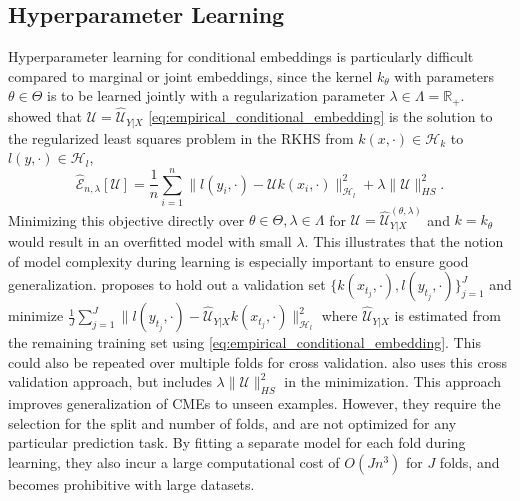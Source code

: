 \documentclass[twoside]{article}
\begin{document}
		\subsection{Hyperparameter Learning}
		
			Hyperparameter learning for conditional embeddings is particularly difficult compared to marginal or joint embeddings, since the kernel $k_{\theta}$ with parameters $\theta \in \Theta$ is to be learned jointly with a regularization parameter $\lambda \in \Lambda = \mathbb{R}_{+}$. \cite{lever2012conditional} showed that $\mathcal{U} = \hat{\mathcal{U}}_{Y | X}$ \eqref{eq:empirical_conditional_embedding} is the solution to the regularized least squares problem in the RKHS from $k(x, \cdot) \in \mathcal{H}_{k}$ to $l(y, \cdot) \in \mathcal{H}_{l}$, 
			\begin{equation}
				\hat{\mathcal{E}}_{n, \lambda}[\mathcal{U}] = \frac{1}{n} \sum_{i = 1}^{n} \big\| l(y_{i}, \cdot) - \mathcal{U} k(x_{i}, \cdot) \big\|_{\mathcal{H}_{l}}^{2} + \lambda \| \mathcal{U} \|^{2}_{HS}.
			\label{eq:lever_objective}
			\end{equation}
			Minimizing this objective directly over $\theta \in \Theta, \lambda \in \Lambda$ for $\mathcal{U} = \hat{\mathcal{U}}^{(\theta, \lambda)}_{Y | X}$ and $k = k_{\theta}$ would result in an overfitted model with small $\lambda$. This illustrates that the notion of model complexity during learning is especially important to ensure good generalization. \cite{lever2012conditional} proposes to hold out a validation set $\{k(x_{t_{j}}, \cdot), l(y_{t_{j}}, \cdot)\}_{j = 1}^{J}$ and minimize $\frac{1}{J} \sum_{j = 1}^{J} \big\| l(y_{t_{j}}, \cdot) - \hat{\mathcal{U}}_{Y | X} k(x_{t_{j}}, \cdot) \big\|_{\mathcal{H}_{l}}^{2}$ where $\hat{\mathcal{U}}_{Y | X}$ is estimated from the remaining training set using \eqref{eq:empirical_conditional_embedding}. This could also be repeated over multiple folds for cross validation. \cite{song2013kernel} also uses this cross validation approach, but includes $\lambda \| \mathcal{U} \|^{2}_{HS}$ in the minimization. This approach improves generalization of \glspl{CME} to unseen examples. However, they require the selection for the split and number of folds, and are not optimized for any particular prediction task. By fitting a separate model for each fold during learning, they also incur a large computational cost of $O(J n^{3})$ for $J$ folds, and becomes prohibitive with large datasets.
			
\end{document}
